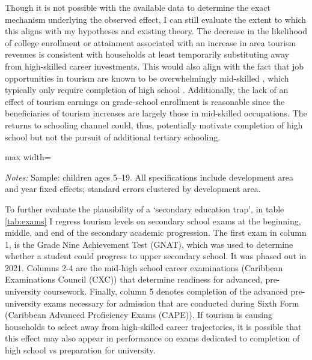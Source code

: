 \documentclass[12pt]{article}
\newcommand*{\TableLagOnePath}{../Paper_3_Tables/Lagged_1Year_Tables}
\begin{document}
		Though it is not possible with the available data to determine the exact mechanism underlying the observed effect, I can still evaluate the extent to which this aligns with my hypotheses and existing theory.  The decrease in the likelihood of college enrollment or attainment associated with an increase in area tourism revenues is consistent with households at least temporarily substituting away from high-skilled career investments. This would also align with the fact that job opportunities in tourism are known to be overwhelmingly mid-skilled \parencite{ mcketty_sun_2026}, which typically only require completion of high school \parencite{ international_labour_office_structure_2012}. Additionally, the lack of an effect of tourism earnings on grade-school enrollment is reasonable since the beneficiaries of tourism increases are largely those in mid-skilled occupations. The returns to schooling channel could, thus, potentially motivate completion of high school but not the pursuit of additional tertiary schooling. 
		
			\begin{table}[h]
			\centering
			\begin{adjustbox}{max width=\textwidth}
				\begin{threeparttable}
					\caption{School Enrollment, IV Estimates}
					\label{tab:enrollment}
					{\small}
					\begin{tablenotes}
						\small
						\item \textit{Notes:} Sample: children ages 5--19. All specifications include development area and year fixed effects; standard errors clustered by development area.
					\end{tablenotes}
				\end{threeparttable}
			\end{adjustbox}
		\end{table}
		
		To further evaluate the plausibility of a `secondary education trap', in  table \ref{tab:exams} I regress tourism levels on secondary school exams at the beginning, middle, and end of the secondary academic progression. The first exam in column 1, is the Grade Nine Achievement Test (GNAT), which was used to determine whether a student could progress to upper secondary school. It was phased out in 2021. Columns 2-4 are the mid-high school career examinations (Caribbean Examinations Council (CXC)) that determine readiness for advanced, pre-university coursework. Finally, column 5 denotes completion of the advanced pre-university exams necessary for admission that are conducted during Sixth Form (Caribbean Advanced Proficiency Exams (CAPE)). If tourism is causing households to select away from high-skilled career trajectories, it is possible that this effect may also appear in performance on exams dedicated to completion of high school vs preparation for university.
		
\end{document}
